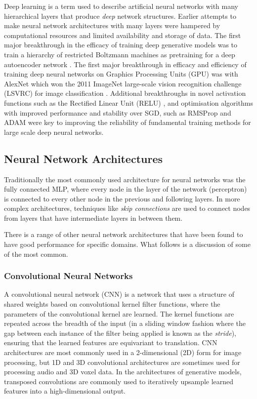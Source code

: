Deep learning is a term used to describe artificial neural networks with many hierarchical layers that produce \textit{deep} network structures. 
Earlier attempts to make neural network architectures with many layers were hampered by computational resources and limited availability and storage of data. 
The first major breakthrough in the efficacy of training deep generative models was to train a hierarchy of restricted Boltzmann machines \citep{ackley1985learning} as pretraining for a deep autoencoder network \citep{hinton2006reducing}. 
The first major breakthrough in efficacy and efficiency of training deep neural networks on Graphics Processing Units (GPU) was with AlexNet \citep{krizhevsky2012imagenet} which won the 2011 ImageNet large-scale vision recognition challenge (LSVRC) for image classification \citep{russakovsky2015imagenet}. 
Additional breakthroughs in novel activation functions such as the Rectified Linear Unit (RELU) \citep{nair2010rectified}, and optimisation algorithms with improved performance and stability over SGD, such as RMSProp \citep{tieleman2012lecture} and ADAM \citep{kingma2015adam} were key to improving the reliability of  fundamental training methods for large scale deep neural networks.


\subsection{Neural Network Architectures}

Traditionally the most commonly used architecture for neural networks was the fully connected MLP, where every node in the layer of the network (perceptron) is connected to every other node in the previous and following layers. 
In more complex architectures, techniques like \textit{skip connections} \citep{raiko2012deep,graves2013generating,hermans2013training} are used to connect nodes from layers that have intermediate layers in between them. 

There is a range of other neural network architectures that have been found to have good performance for specific domains. 
What follows is a discussion of some of the most common.

\subsubsection{Convolutional Neural Networks}

A convolutional neural network (CNN) \citep{fukushima1982neocognitron} is a network that uses a structure of shared weights based on convolutional kernel filter functions, where the parameters of the convolutional kernel are learned. 
The kernel functions are repeated across the breadth of the input (in a sliding window fashion where the gap between each instance of the filter being applied is known as the \textit{stride}), ensuring that the learned features are equivariant to translation. 
CNN architectures are most commonly used in a 2-dimensional (2D) form for image processing, but 1D and 3D convolutional architectures are sometimes used for processing audio and 3D voxel data. 
In the architectures of generative models, transposed convolutions are commonly used to iteratively upsample learned features into a high-dimensional output.

